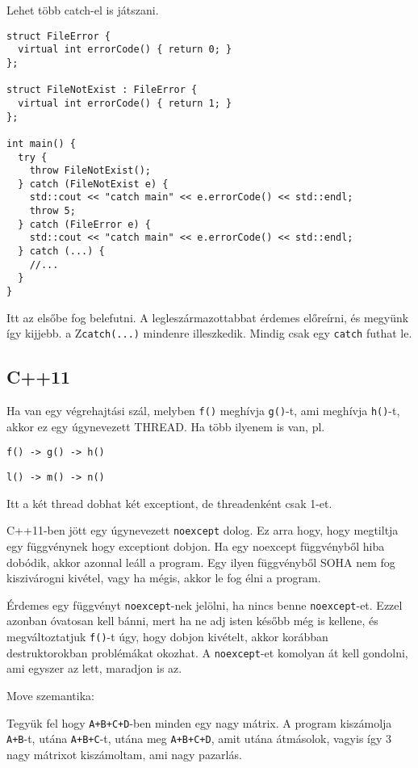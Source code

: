 \documentclass[a4paper,11.5pt]{article}
\begin{document}
		Lehet több catch-el is játszani.
		\begin{lstlisting}
struct FileError {
  virtual int errorCode() { return 0; }
};

struct FileNotExist : FileError {
  virtual int errorCode() { return 1; }
};

int main() {
  try {
    throw FileNotExist();
  } catch (FileNotExist e) {
    std::cout << "catch main" << e.errorCode() << std::endl;
    throw 5;
  } catch (FileError e) {
    std::cout << "catch main" << e.errorCode() << std::endl;
  } catch (...) {
    //...
  }
}
		\end{lstlisting}
		Itt az elsőbe fog belefutni. A legleszármazottabbat érdemes előreírni, és megyünk így kijjebb. a Z\texttt{catch(...)} mindenre illeszkedik. Mindig csak egy \texttt{catch} futhat le.
		\bigskip
		
		\subsection{C++11}
		
		Ha van egy végrehajtási szál, melyben \texttt{f()} meghívja \texttt{g()}-t, ami meghívja \texttt{h()}-t, akkor ez egy úgynevezett THREAD. Ha több ilyenem is van, pl.
		
		\texttt{f() -> g() -> h()}
		
		\texttt{l() -> m() -> n()}
		
		Itt a két thread dobhat két exceptiont, de threadenként csak 1-et.
		
		\medskip
		C++11-ben jött egy úgynevezett \texttt{noexcept} dolog. Ez arra hogy, hogy megtiltja egy függvénynek hogy exceptiont dobjon. Ha egy noexcept függvényből hiba dobódik, akkor azonnal leáll a program. Egy ilyen függvényből SOHA nem fog kiszivárogni kivétel, vagy ha mégis, akkor le fog élni a program.
		
		Érdemes egy függvényt \texttt{noexcept}-nek jelölni, ha nincs benne \texttt{noexcept}-et. Ezzel azonban óvatosan kell bánni, mert ha ne adj isten később még is kellene, és megváltoztatjuk \texttt{f()}-t úgy, hogy dobjon kivételt, akkor korábban destruktorokban problémákat okozhat. A \texttt{noexcept}-et komolyan át kell gondolni, ami egyszer az lett, maradjon is az.
		\medskip
		
		Move szemantika:
		
		Tegyük fel hogy \texttt{A+B+C+D}-ben minden egy nagy mátrix. A program kiszámolja \texttt{A+B}-t, utána \texttt{A+B+C}-t, utána meg \texttt{A+B+C+D}, amit utána átmásolok, vagyis így 3 nagy mátrixot kiszámoltam, ami nagy pazarlás.
		
\end{document}
